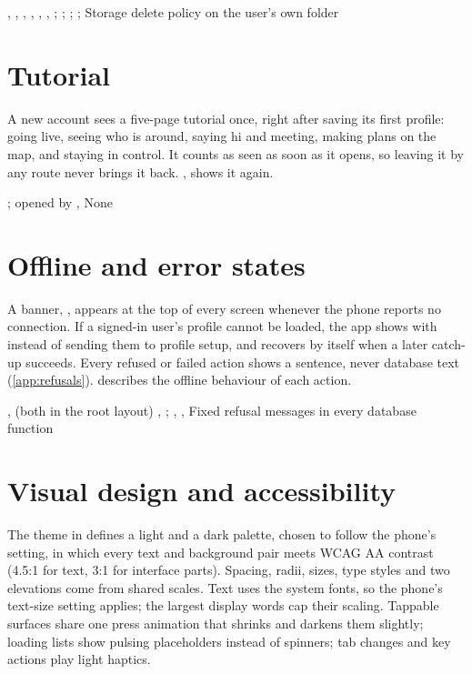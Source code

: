 \implemented
  {, , , , , }
  {, ; ; ; }
  {; Storage delete policy on the user's own folder}

\section{Tutorial}

A new account sees a five-page tutorial once, right after saving its first profile: going live, seeing who
is around, saying hi and meeting, making plans on the map, and staying in control. It counts as seen as
soon as it opens, so leaving it by any route never brings it back. ,  shows it
again.

\implemented
  {; opened by }
  {, }
  {None}

\section{Offline and error states}
\label{sec:feature-offline}

A banner, , appears at the top of every screen whenever
the phone reports no connection. If a signed-in user's profile cannot be loaded, the app shows  with  instead of sending them to profile setup, and recovers by itself when a
later catch-up succeeds. Every refused or failed action shows a sentence, never database text
(\cref{app:refusals}).  describes the offline behaviour of each action.

\implemented
  {,  (both in the root layout)}
  {, ; , , }
  {Fixed refusal messages in every database function}

\section{Visual design and accessibility}

The theme in  defines a light and a dark palette, chosen to follow the phone's
setting, in which every text and background pair meets WCAG AA contrast (4.5:1 for text, 3:1 for
interface parts). Spacing, radii, sizes, type styles and two elevations come from shared scales. Text
uses the system fonts, so the phone's text-size setting applies; the largest display words cap their
scaling. Tappable surfaces share one press animation that shrinks and darkens them slightly; loading lists
show pulsing placeholders instead of spinners; tab changes and key actions play light haptics.

